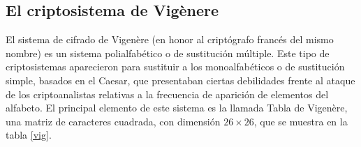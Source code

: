 \subsection{El criptosistema de Vig\`enere}
El sistema de cifrado de Vigen\`ere (en honor al cript\'ografo
franc\'es del mismo nombre) es un sistema polialfab\'etico o
de sustituci\'on m\'ultiple. Este tipo de criptosistemas aparecieron
para sustituir a los monoalfab\'eticos o de sustituci\'on simple,
basados en el Caesar, que presentaban ciertas debilidades frente al ataque
de los criptoanalistas relativas a la frecuencia de aparici\'on de
elementos del alfabeto. El principal elemento de este sistema es la llamada
Tabla de Vigen\`ere, una matriz de caracteres cuadrada, con dimensi\'on 
$26\times26$, que se muestra en la tabla \ref{vig}.\\
